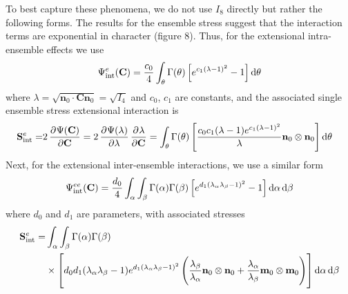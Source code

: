     To best capture these phenomena, we do not use $I_8$ directly but rather the following forms. The results for the ensemble stress suggest that the interaction terms are exponential in character (figure 8). Thus, for the extensional intra-ensemble effects we use
        \begin{equation}\label{c3:eqn:410}
        \begin{aligned}
        \Psi_\mathrm{int}^e(\mathbf{C}) = \frac{c_0}{4}\int_\theta\Gamma(\theta)\left[e^{c_1(\lambda-1)^2} - 1\right]\dif \theta
        \end{aligned}
        \end{equation}
    where $\lambda = \sqrt{\mathbf{n}_0\cdot\mathbf{C}\mathbf{n}_0} = \sqrt{I_4}$ and $c_0$, $c_1$ are constants, and the associated single ensemble stress extensional interaction is
        \begin{equation}\label{c3:eqn:411}
        \begin{aligned}
        \mathbf{S}_\mathrm{int}^e =& 2\dpd{\Psi(\mathbf{C})}{\mathbf{C}} = 2 \dpd{\Psi(\lambda)}{\lambda}\dpd{\lambda}{\mathbf{C}}
        = \int_\theta \Gamma(\theta)\left[\frac{c_0c_1(\lambda-1)e^{c_1(\lambda-1)^2}}{\lambda}\mathbf{n}_0\otimes\mathbf{n}_0\right]\dif \theta
        \end{aligned}
        \end{equation}
    Next, for the extensional inter-ensemble interactions, we use a similar form
        \begin{equation}\label{c3:eqn:412}
        \begin{aligned}
        \Psi_\mathrm{int}^{ee}(\mathbf{C}) = \frac{d_0}{4}\int_\alpha\int_\beta\Gamma(\alpha)\Gamma(\beta)\left[e^{d_1(\lambda_\alpha\lambda_\beta-1)^2} - 1\right]\dif \alpha \dif\beta
        \end{aligned}
        \end{equation}
    where $d_0$ and $d_1$ are parameters, with associated stresses
        \begin{equation}\label{c3:eqn:413}
        \begin{aligned}
        \mathbf{S}_\mathrm{int}^e =& \int_\alpha\int_\beta \Gamma(\alpha)\Gamma(\beta) \\
        &\times\left[d_0d_1(\lambda_\alpha\lambda_\beta-1)e^{d_1(\lambda_\alpha\lambda_\beta-1)^2}\left(\frac{\lambda_\beta}{\lambda_\alpha}\mathbf{n}_0\otimes\mathbf{n}_0 + \frac{\lambda_\alpha}{\lambda_\beta}\mathbf{m}_0\otimes\mathbf{m}_0\right)\right]\dif\alpha\dif\beta
        \end{aligned}
        \end{equation}
